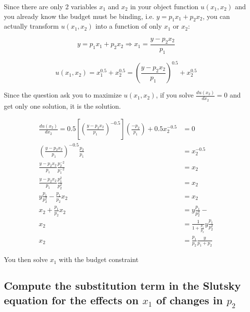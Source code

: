 \documentclass{article}
\begin{document}
\begin{mdframed}[backgroundcolor=blue!20,linecolor=white]
Since there are only 2 variables $x_1$ and $x_2$ in your object function
$u(x_1,x_2)$ and you already know the budget must be binding, i.e.
$y = p_1x_1 + p_2x_2$, you can actually transform $u(x_1,x_2)$  into 
a function of only $x_1$ or $x_2$:

$$y = p_1x_1 + p_2x_2 \Rightarrow x_1 = \frac{y-p_2x_2}{p_1}$$

$$u(x_1,x_2)= x_1^{0.5} + x_2^{0.5} = (\frac{y-p_2x_2}{p_1})^0.5 + x_2^0.5$$

Since the question ask you to maximize $u(x_1,x_2)$, if you solve $\frac{d u(x_2)}{d x_2} = 0$ and get only one solution, it is the solution.


\begin{align*}
\frac{d u(x_2)}{d x_2} = 0.5[ (\frac{y-p_2x_2}{p_1})^{-0.5}](\frac{-p_2}{p_1}) + 0.5x_2^{-0.5} &= 0 \\
(\frac{y-p_2x_2}{p_1})^{-0.5}\frac{p_2}{p_1} &= x_2^{-0.5} \\
\frac{y-p_2x_2}{p_1}\frac{p_2^{-2}}{p_1^{-2}} &= x_2 \\
\frac{y-p_2x_2}{p_1}\frac{p_1^{2}}{p_2^{2}} &= x_2 \\
y\frac{p_1}{p_2^{2}} - \frac{p_1}{p_2}x_2&= x_2 \\
x_2 + \frac{p_1}{p_2}x_2 &=  y\frac{p_1}{p_2^{2}} -\\
x_2 &=  \frac{1}{1+\frac{p_1}{p_2}}y\frac{p_1}{p_2^{2}} \\
x_2 &=  \frac{p_1}{p_2}\frac{y}{p_1 + p_2}
\end{align*}

You then solve $x_1$ with the budget constraint
\end{mdframed}







\subsection{Compute the substitution term in the Slutsky equation for the effects on $x_1$ of changes in $p_2$}
\end{document}
